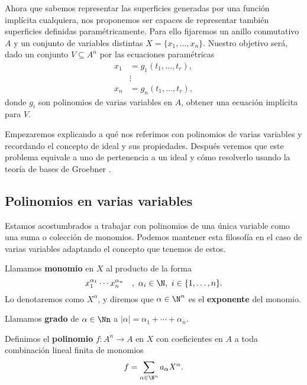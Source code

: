 
Ahora que sabemos representar las superficies generadas por una función implícita cualquiera, nos proponemos ser capaces de representar también superficies definidas paramétricamente. Para ello fijaremos un anillo conmutativo $A$ y un conjunto de variables distintas $X=\{x_1,\dots, x_n\}$. Nuestro objetivo será, dado un conjunto $V\subseteq A^n$ por las ecuaciones paramétricas
\begin{align*}
    x_1 &= g_1(t_1,\dots, t_r),\\
    &\vdots \\
    x_n &= g_n(t_1,\dots, t_r),
\end{align*}
donde $g_i$ son polinomios de varias variables en $A$, obtener una ecuación implícita para $V$.\newline

Empezaremos explicando a qué nos referimos con polinomios de varias variables y recordando el concepto de ideal y sus propiedades. Después veremos que este problema equivale a uno de pertenencia a un ideal y cómo resolverlo usando la teoría de bases de Groebner \cite{ideals_varieties}.

\subsection{Polinomios en varias variables}
Estamos acostumbrados a trabajar con polinomios de una única variable como una suma o colección de monomios. Podemos mantener esta filosofía en el caso de varias variables adaptando el concepto que tenemos de estos.

\begin{definicion}
    Llamamos \textbf{monomio} en $X$ al producto de la forma
    $$x_1^{\alpha_1} \cdots x_n^{\alpha_n}\quad,\ \alpha_i \in \N,\ i\in\{1,\dots, n\}.$$
    Lo denotaremos como $X^{\alpha}$, y diremos que $\alpha\in \N^n$ es el \textbf{exponente} del monomio.
\end{definicion}


\begin{definicion}
    Llamamos \textbf{grado} de $\alpha\in\Nn$ a $\vert \alpha\vert = \alpha_1+\cdots + \alpha_n$.
\end{definicion}

\begin{definicion}
    Definimos el \textbf{polinomio} $f:A^n\to A$ en $X$ con coeficientes en $A$ a toda combinación lineal finita de monomios
    \begin{align*}
        f = \sum_{\alpha\in \N^n} a_{\alpha} X^{\alpha}.
    \end{align*}

\end{definicion}

